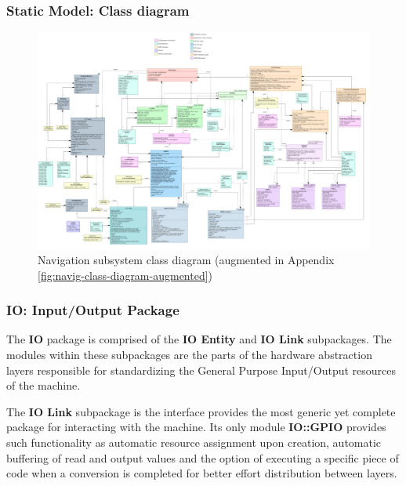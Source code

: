 \subsubsection{Static Model: Class diagram}


\begin{figure}[H]
	\centering
	\includegraphics[width=\textwidth]{./img/navig-class-diagram.png}
	\caption {Navigation subsystem class diagram (augmented in Appendix \ref{fig:navig-class-diagram-augmented})}
	\label{fig:navig-class-diagram}
	\end{figure}



\subsubsection{IO: Input/Output Package}
\label{sec:io-package}
The \textbf{IO} package is comprised of the \textbf{IO Entity} and \textbf{IO Link} subpackages. The modules within these subpackages are the parts of the hardware abstraction layers responsible for standardizing the General Purpose Input/Output resources of the machine.

The \textbf{IO Link} subpackage is the interface provides the most generic yet complete package for interacting with the machine. Its only module \textbf{IO::GPIO} provides such functionality as automatic resource assignment upon creation, automatic buffering of read and output values and the option of executing a specific piece of code when a conversion is completed for better effort distribution between layers.

